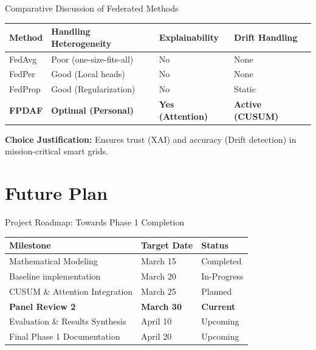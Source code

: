 \documentclass[aspectratio=169, 11pt]{beamer}
\begin{document}
\begin{frame}{Comparative Discussion of Federated Methods}
    \centering
    \small
    \begin{table}
        \begin{tabular}{l p{2.5cm} p{2cm} p{2.5cm}}
            \toprule
            \textbf{Method} & \textbf{Handling Heterogeneity} & \textbf{Explainability} & \textbf{Drift Handling} \\
            \midrule
            FedAvg & Poor (one-size-fits-all) & No & None \\
            FedPer & Good (Local heads) & No & None \\
            FedProp & Good (Regularization) & No & Static \\
            \midrule
            \textbf{FPDAF} & \textbf{Optimal (Personal)} & \textbf{Yes (Attention)} & \textbf{Active (CUSUM)} \\
            \bottomrule
        \end{tabular}
    \end{table}
    \vspace{0.3cm}
    \textbf{Choice Justification:} Ensures trust (XAI) and accuracy (Drift detection) in mission-critical smart grids.
\end{frame}

\section{Future Plan}
\begin{frame}{Project Roadmap: Towards Phase 1 Completion}
    \begin{table}
        \centering
        \small
        \begin{tabular}{|l|l|l|}
            \hline
            \textbf{Milestone} & \textbf{Target Date} & \textbf{Status} \\
            \hline
            Mathematical Modeling & March 15 & Completed \\
            \hline
            Baseline implementation & March 20 & In-Progress \\
            \hline
            CUSUM \& Attention Integration & March 25 & Planned \\
            \hline
            \textbf{Panel Review 2} & \textbf{March 30} & \textbf{Current} \\
            \hline
            Evaluation \& Results Synthesis & April 10 & Upcoming \\
            \hline
            Final Phase 1 Documentation & April 20 & Upcoming \\
            \hline
        \end{tabular}
    \end{table}
\end{frame}
\end{document}
